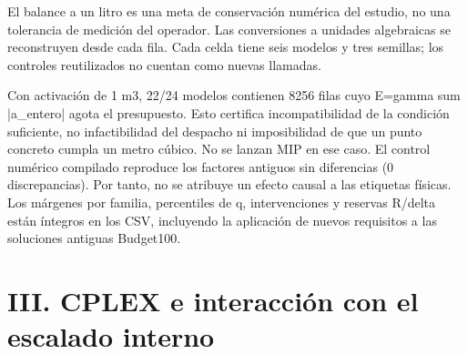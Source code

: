 \documentclass[a4paper,10pt]{article}
\begin{document}
El balance a un litro es una meta de conservación numérica del estudio,
no una tolerancia de medición del operador. Las conversiones a unidades
algebraicas se reconstruyen desde cada fila. Cada celda tiene seis modelos
y tres semillas; los controles reutilizados no cuentan como nuevas llamadas.

\begin{center}\small{}\end{center}

Con activación de 1 m3, 22/24 modelos contienen 8256 filas
cuyo E=gamma sum |a\_entero| agota el presupuesto. Esto certifica incompatibilidad
de la condición suficiente, no infactibilidad del despacho ni imposibilidad
de que un punto concreto cumpla un metro cúbico. No se lanzan MIP en ese caso.
El control numérico compilado reproduce los factores antiguos sin diferencias (0 discrepancias).
Por tanto, no se atribuye un efecto causal a las etiquetas físicas. Los
márgenes por familia, percentiles de q, intervenciones y reservas R/delta
están íntegros en los CSV, incluyendo la aplicación de nuevos requisitos
a las soluciones antiguas Budget100.

\section*{III. CPLEX e interacción con el escalado interno}
\end{document}
